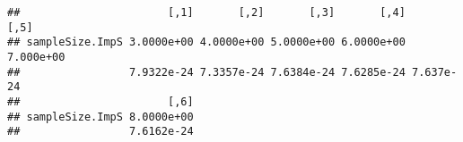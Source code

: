 \documentclass[
]{article}
\begin{document}
\begin{verbatim}
##                       [,1]       [,2]       [,3]       [,4]      [,5]
## sampleSize.ImpS 3.0000e+00 4.0000e+00 5.0000e+00 6.0000e+00 7.000e+00
##                 7.9322e-24 7.3357e-24 7.6384e-24 7.6285e-24 7.637e-24
##                       [,6]
## sampleSize.ImpS 8.0000e+00
##                 7.6162e-24
\end{verbatim}
\end{document}
